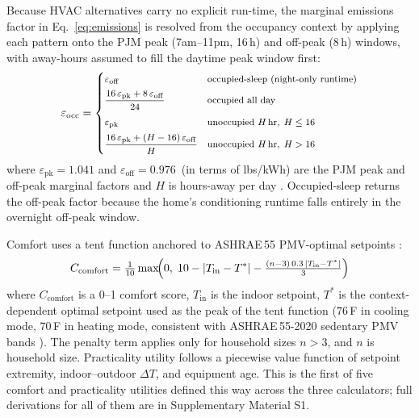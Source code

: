 \documentclass[a4paper,fleqn]{cas-dc}
\begin{document}
Because HVAC alternatives carry no explicit run-time, the marginal emissions factor in Eq.~\ref{eq:emissions} is resolved from the occupancy context by applying each pattern onto the PJM peak (7am--11pm, 16\,h) and off-peak (8\,h) windows, with away-hours assumed to fill the daytime peak window first:
\begin{equation}
\footnotesize
  \varepsilon_{\mathrm{occ}} =
  \begin{cases}
    \varepsilon_{\mathrm{off}} & \text{occupied-sleep (night-only runtime)} \\[4pt]
    \dfrac{16\,\varepsilon_{\mathrm{pk}} + 8\,\varepsilon_{\mathrm{off}}}{24}
      & \text{occupied all day} \\[8pt]
    \varepsilon_{\mathrm{pk}} & \text{unoccupied } H\text{\,hr},\; H \le 16 \\[4pt]
    \dfrac{16\,\varepsilon_{\mathrm{pk}} + (H-16)\,\varepsilon_{\mathrm{off}}}{H}
      & \text{unoccupied } H\text{\,hr},\; H > 16
  \end{cases}
  \normalsize
  \label{eq:hvac_occ_emissions}
\end{equation}
\noindent where $\varepsilon_{\mathrm{pk}} = 1.041$ and $\varepsilon_{\mathrm{off}} = 0.976$\ (in terms of lbs/kWh) are the PJM peak and off-peak marginal factors and $H$ is hours-away per day \citep{pjm2022emissions}. Occupied-sleep returns the off-peak factor because the home's conditioning runtime falls entirely in the overnight off-peak window.

Comfort uses a tent function anchored to ASHRAE\,55 PMV-optimal setpoints \citep{ashrae55_2020,vanhoof2008,fanger1970}:
\begin{equation}
  C_{\mathrm{comfort}} = \tfrac{1}{10}\max\!\Bigl(0,\; 10 - \lvert T_{\mathrm{in}} - T^{*}\rvert - \tfrac{(n-3)\,0.3\,\lvert T_{\mathrm{in}} - T^{*}\rvert}{3}\Bigr)
  \label{eq:hvac_comfort}
\end{equation}
\noindent where $C_{\mathrm{comfort}}$ is a 0--1 comfort score, $T_{\mathrm{in}}$ is the indoor setpoint, $T^{*}$ is the context-dependent optimal setpoint used as the peak of the tent function ($76$\,\textdegree{}F in cooling mode, $70$\,\textdegree{}F in heating mode, consistent with ASHRAE\,55-2020 sedentary PMV bands \citep{ashrae55_2020}). The penalty term applies only for household sizes $n > 3$, and $n$ is household size.
Practicality utility follows a piecewise value function of setpoint extremity, indoor--outdoor $\Delta T$, and equipment age. This is the first of five comfort and practicality utilities defined this way across the three calculators; full derivations for all of them are in Supplementary Material S1.
\end{document}
